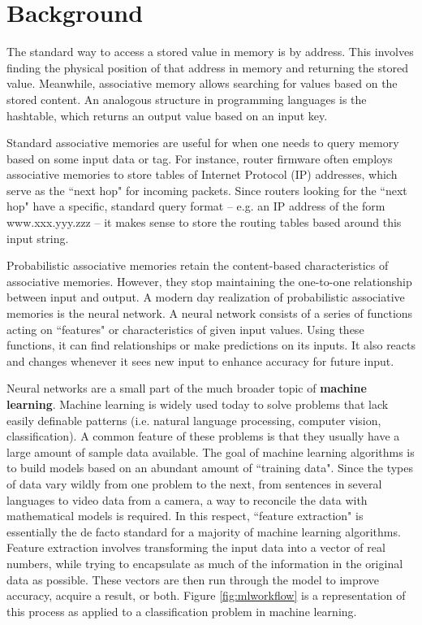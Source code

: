 \documentclass{sig-alternate}
\begin{document}
\section{Background}
\label{sec:intro}

The standard way to access a stored value in memory is by address. 
This involves finding the physical position of that address in memory
and returning the stored value. Meanwhile, associative memory allows
searching for values based on the stored content. An analogous structure
in programming languages is the hashtable, which returns an output value
based on an input key. 

Standard associative memories are useful for when one needs to query memory based 
on some input data or tag. For instance, router firmware often employs associative 
memories to store tables of Internet Protocol (IP) addresses, which serve as the ``next hop" for incoming 
packets. Since routers looking for the ``next hop" have a specific, standard query 
format -- e.g. an IP address of the form www.xxx.yyy.zzz -- it makes sense to store the 
routing tables based around this input string.

Probabilistic associative memories retain the content-based characteristics of associative memories.
However, they stop maintaining the one-to-one relationship between input and output.
A modern day realization of probabilistic associative memories is the neural network. A neural network
consists of a series of functions acting on ``features" or characteristics of given input values. Using
these functions, it can find relationships or make predictions on its inputs. It also
reacts and changes whenever it sees new input to enhance accuracy for future input.

Neural networks are a small part of the much broader topic of \textbf{machine learning}. Machine learning
is widely used today to solve problems that lack easily definable patterns (i.e. natural language processing,
computer vision, classification). A common feature of these problems is that they usually have a large amount
of sample data available. The goal of machine learning algorithms is to build models based on an
abundant amount of ``training data". Since the types of data vary wildly from one problem to the next,
from sentences in several languages to video data from a camera, a way to reconcile the data with
mathematical models is required. In this respect, ``feature extraction" is essentially the de facto
standard for a majority of machine learning algorithms. Feature extraction involves transforming the
input data into a vector of real numbers, while trying to encapsulate as much of the information
in the original data as possible. These vectors are then run through the model to improve accuracy,
acquire a result, or both. Figure \ref{fig:mlworkflow} is a representation of this process as
applied to a classification problem in machine learning. 
\end{document}
